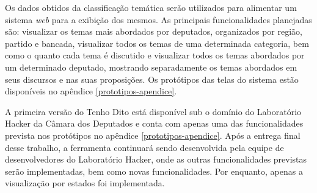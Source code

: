 Os dados obtidos da classificação temática serão utilizados para alimentar um sistema \textit{web} para a exibição dos
mesmos. As principais funcionalidades planejadas são: visualizar os temas mais abordados por deputados, organizados por região, partido e bancada, visualizar todos os temas de uma determinada categoria, bem como o quanto cada tema é discutido e visualizar todos os temas abordados por um determinado deputado, mostrando separadamente os temas abordados em seus discursos e nas suas proposições. Os protótipos das telas do sistema estão disponíveis no apêndice \ref{prototipos-apendice}.

A primeira versão do Tenho Dito está disponível sub o domínio do Laboratório Hacker da Câmara dos Deputados e conta com apenas uma das funcionalidades prevista nos protótipos no apêndice \ref{prototipos-apendice}. Após a entrega final desse trabalho, a ferramenta continuará sendo desenvolvida pela equipe de desenvolvedores do Laboratório Hacker, onde as outras funcionalidades previstas serão implementadas, bem como novas funcionalidades. Por enquanto, apenas a visualização por estados foi implementada.
